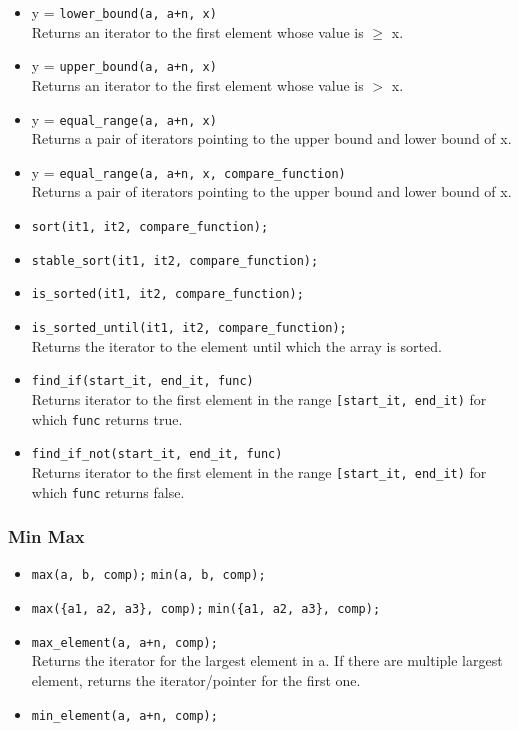 \begin{itemize}
\item y = \texttt{lower\_bound(a, a+n, x)}\\
Returns an iterator to the first element whose value is $\geq$ x.\\
\item y = \texttt{upper\_bound(a, a+n, x)}\\
Returns an iterator to the first element whose value is $>$ x.\\
\item y = \texttt{equal\_range(a, a+n, x)}\\
Returns a pair of iterators pointing to the upper bound and lower bound of x.\\
\item y = \texttt{equal\_range(a, a+n, x, compare\_function)}\\
Returns a pair of iterators pointing to the upper bound and lower bound of x.\\
\item \texttt{sort(it1, it2, compare\_function);}
\item \texttt{stable\_sort(it1, it2, compare\_function);}
\item \texttt{is\_sorted(it1, it2, compare\_function);}
\item \texttt{is\_sorted\_until(it1, it2, compare\_function);}\\
Returns the iterator to the element until which the array is sorted.\\
\item \texttt{find\_if(start\_it, end\_it, func)}\\
Returns iterator to the first element in the range \texttt{[start\_it, end\_it)} for which \texttt{func} returns true.
\item \texttt{find\_if\_not(start\_it, end\_it, func)}\\
Returns iterator to the first element in the range \texttt{[start\_it, end\_it)} for which \texttt{func} returns false.
\end{itemize}


\subsubsection{Min Max}
\begin{itemize}
\item \texttt{max(a, b, comp);} \texttt{min(a, b, comp);}
\item \texttt{max(\{a1, a2, a3\}, comp);} \texttt{min(\{a1, a2, a3\}, comp);}
\item \texttt{max\_element(a, a+n, comp);}\\
Returns the iterator for the largest element in a. If there are multiple largest element, returns the iterator/pointer for the first one.
\item \texttt{min\_element(a, a+n, comp);}\\
\end{itemize}

